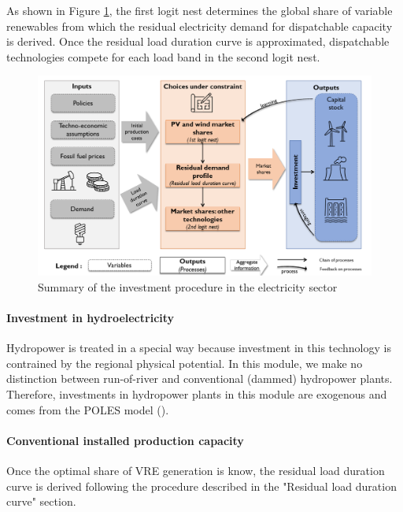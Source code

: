 As shown in Figure \ref{fig:suminv}, the first logit nest determines the global share of variable renewables from which the residual electricity demand for dispatchable capacity is derived. Once the residual load duration curve is approximated, dispatchable technologies compete for each load band in the second logit nest.

\begin{figure}[H]
    \centerline{\includegraphics[scale=0.45]{figures&tables/Summary_nexus.png}} %
    \caption{Summary of the investment procedure in the electricity sector}
    \label{fig:suminv}
\end{figure}


\paragraph{Investment in hydroelectricity}

Hydropower is treated in a special way because investment in this technology is contrained by the regional physical potential.
In this module, we make no distinction between run-of-river and conventional (dammed) hydropower plants. Therefore, investments in hydropower plants in this module are exogenous and comes from the POLES model (\cite{Keramidas2018}).


\paragraph{Conventional installed production capacity}

Once the optimal share of VRE generation is know, the residual load duration curve is derived following the procedure described in the "Residual load duration curve" section.



